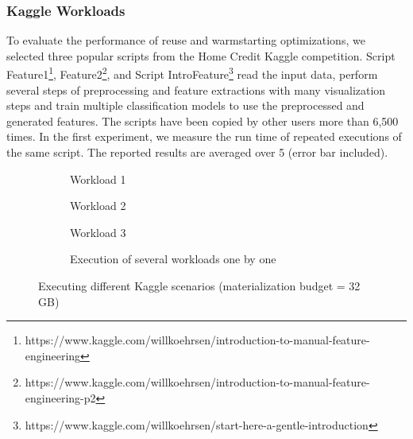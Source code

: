\subsubsection{Kaggle Workloads}
To evaluate the performance of reuse and warmstarting optimizations, we selected three popular scripts from the Home Credit Kaggle competition.
Script Feature1\footnote{https://www.kaggle.com/willkoehrsen/introduction-to-manual-feature-engineering}, Feature2\footnote{https://www.kaggle.com/willkoehrsen/introduction-to-manual-feature-engineering-p2}, and Script IntroFeature\footnote{https://www.kaggle.com/willkoehrsen/start-here-a-gentle-introduction} read the input data, perform several steps of preprocessing and feature extractions with many visualization steps and train multiple classification models to use the preprocessed and generated features.
The scripts have been copied by other users more than 6,500 times.
In the first experiment, we measure the run time of repeated executions of the same script.
The reported results are averaged over 5 (error bar included).
\begin{figure}
\begin{subfigure}[b]{0.33\linewidth}
\centering
 \resizebox{\columnwidth}{!}{%
%
}

\caption{Workload 1}
\end{subfigure}%
\begin{subfigure}[b]{0.33\linewidth}
\centering
 \resizebox{\columnwidth}{!}{%
%
}

\caption{Workload 2}
\end{subfigure}%
\begin{subfigure}[b]{0.33\linewidth}
\centering
 \resizebox{\columnwidth}{!}{%
%
}
\caption{Workload 3}
\end{subfigure}
\begin{subfigure}[b]{\linewidth}
\centering
 \resizebox{\columnwidth}{!}{%
%
}
\caption{Execution of several workloads one by one}
\end{subfigure}
\caption{Executing different Kaggle scenarios (materialization budget = 32 GB)}
\label{exp-reuse-kaggle-same-workload}
\end{figure}

